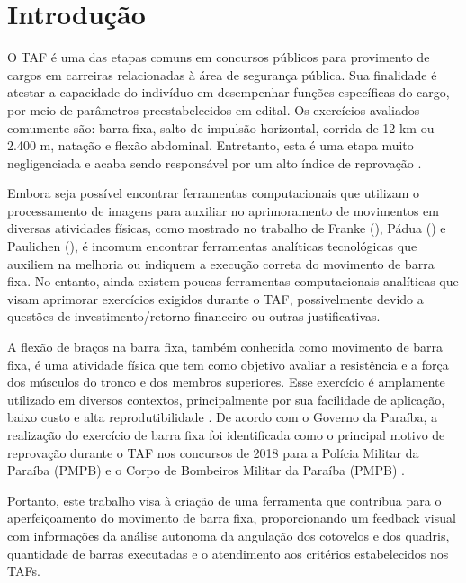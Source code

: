 \chapter{Introdução}


O \ac{TAF} é uma das etapas comuns em concursos públicos para provimento de cargos em carreiras relacionadas à área de segurança pública. Sua finalidade é atestar a capacidade do indivíduo em desempenhar funções específicas do cargo, por meio de parâmetros preestabelecidos em edital. Os exercícios avaliados comumente são: barra fixa, salto de impulsão horizontal, corrida de 12 km ou 2.400 m, natação e flexão abdominal. Entretanto, esta é uma etapa muito negligenciada e acaba sendo responsável por um alto índice de reprovação \cite{reprovaTAF}.

Embora seja possível encontrar ferramentas computacionais que utilizam o processamento de imagens para auxiliar no aprimoramento de movimentos em diversas atividades físicas, como mostrado no trabalho de Franke (\citeyear{vcBicicleta}), Pádua (\citeyear{vcFutebol}) e Paulichen (\citeyear{futebolTatica}), é incomum encontrar ferramentas analíticas tecnológicas que auxiliem na melhoria ou indiquem a execução correta do movimento de barra fixa. No entanto, ainda existem poucas ferramentas computacionais analíticas que visam aprimorar exercícios exigidos durante o \ac{TAF}, possivelmente devido a questões de investimento/retorno financeiro ou outras justificativas.

A flexão de braços na barra fixa, também conhecida como movimento de barra fixa, é uma atividade física que tem como objetivo avaliar a resistência e a força dos músculos do tronco e dos membros superiores. Esse exercício é amplamente utilizado em diversos contextos, principalmente por sua facilidade de aplicação, baixo custo e alta reprodutibilidade \cite{barraFixa}. De acordo com o Governo da Paraíba, a realização do exercício de barra fixa foi identificada como o principal motivo de reprovação durante o \ac{TAF} nos concursos de 2018 para a Polícia Militar da Paraíba (PMPB) e o Corpo de Bombeiros Militar da Paraíba (PMPB) \cite{barraTAF}.

Portanto, este trabalho visa à criação de uma ferramenta que contribua para o aperfeiçoamento do movimento de barra fixa, proporcionando um feedback visual com informações da análise autonoma da angulação dos cotovelos e dos quadris, quantidade de barras executadas e o atendimento aos critérios estabelecidos nos \ac{TAF}s.